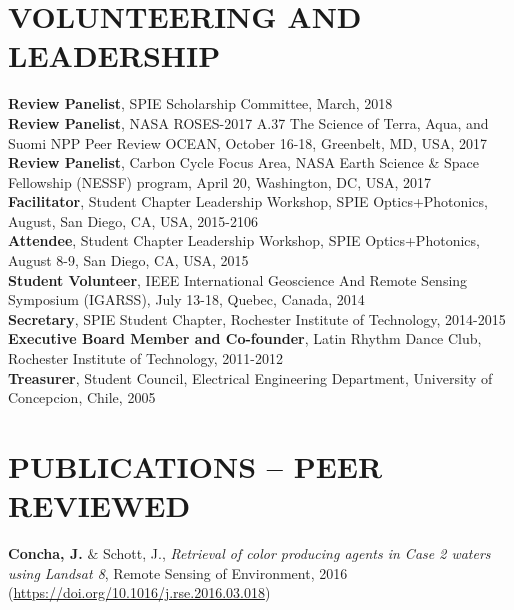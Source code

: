 \documentclass[11pt]{res} %
\begin{document}
\begin{resume}
\vspace{-0.1in}
\section{VOLUNTEERING AND LEADERSHIP}
\vspace{0.1in}
{\bf Review Panelist}, SPIE Scholarship Committee, March, 2018
\vspace{0.1in}\\
{\bf Review Panelist}, NASA ROSES-2017 A.37 The Science of Terra, Aqua, and Suomi NPP Peer Review OCEAN, October 16-18, Greenbelt, MD, USA, 2017
\vspace{0.1in}\\
{\bf Review Panelist}, Carbon Cycle Focus Area, NASA Earth Science \& Space Fellowship (NESSF) program, April 20, Washington, DC, USA, 2017
\vspace{0.1in}\\
{\bf Facilitator}, Student Chapter Leadership Workshop, SPIE Optics+Photonics, August, San Diego, CA, USA, 2015-2106
\vspace{0.1in}\\
{\bf Attendee}, Student Chapter Leadership Workshop, SPIE Optics+Photonics, August 8-9, San Diego, CA, USA, 2015
\vspace{0.1in}\\
{\bf Student Volunteer}, IEEE International Geoscience And Remote Sensing Symposium (IGARSS), July 13-18, Quebec, Canada, 2014
\vspace{0.1in}\\
{\bf Secretary}, SPIE Student Chapter, Rochester Institute of Technology, 2014-2015
\vspace{0.1in}\\
{\bf Executive Board Member and Co-founder}, Latin Rhythm Dance Club, Rochester Institute of Technology, 2011-2012
\vspace{0.1in}\\
{\bf Treasurer}, Student Council, Electrical Engineering Department, University of Concepcion, Chile, 2005\\

\vspace{.5in}
\section{PUBLICATIONS -- PEER REVIEWED}
\vspace{0.1in}
{\bf Concha, J.} $\&$ Schott, J., {\it Retrieval of color producing agents in Case 2 waters using Landsat 8}, Remote Sensing of Environment, 2016 (\url{https://doi.org/10.1016/j.rse.2016.03.018})


\end{resume}
\end{document}
